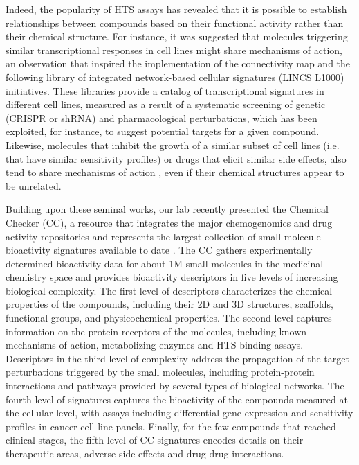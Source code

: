 Indeed, the popularity of HTS assays has revealed that it is possible to establish relationships between compounds based on their functional activity rather than their chemical structure. For instance, it was suggested that molecules triggering similar transcriptional responses in cell lines might share mechanisms of action, an observation that inspired the implementation of the connectivity map \cite{lamb_connectivity_2006} and the following library of integrated network-based cellular signatures (LINCS L1000) \cite{subramanian_next_2017} initiatives. These libraries provide a catalog of transcriptional signatures in different cell lines, measured as a result of a systematic screening of genetic (CRISPR or shRNA) and pharmacological perturbations, which has been exploited, for instance, to suggest potential targets for a given compound\cite{sawada_predicting_2018}. Likewise, molecules that inhibit the growth of a similar subset of cell lines (i.e. that have similar sensitivity profiles) \cite{holbeck_analysis_2010} or drugs that elicit similar side effects, also tend to share mechanisms of action \cite{campillos_drug_2008}, even if their chemical structures appear to be unrelated.

Building upon these seminal works, our lab recently presented the Chemical Checker (CC), a resource that integrates the major chemogenomics and drug activity repositories and represents the largest collection of small molecule bioactivity signatures available to date \cite{duran-frigola_extending_2020}. The CC gathers experimentally determined bioactivity data for about 1M small molecules in the medicinal chemistry space and provides bioactivity descriptors in five levels of increasing biological complexity. The first level of descriptors characterizes the chemical properties of the compounds, including their 2D and 3D structures, scaffolds, functional groups, and physicochemical properties. The second level captures information on the protein receptors of the molecules, including known mechanisms of action, metabolizing enzymes and HTS binding assays. Descriptors in the third level of complexity address the propagation of the target perturbations triggered by the small molecules, including protein-protein interactions and pathways provided by several types of biological networks. The fourth level of signatures captures the bioactivity of the compounds measured at the cellular level, with assays including differential gene expression and sensitivity profiles in cancer cell-line panels. Finally, for the few compounds that reached clinical stages, the fifth level of CC signatures encodes details on their therapeutic areas, adverse side effects and drug-drug interactions.


